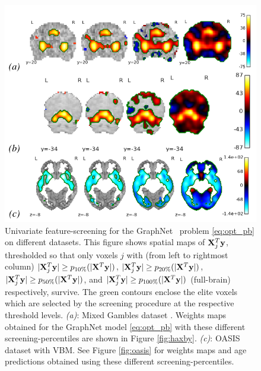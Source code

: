  \begin{figure}[!htb]
   \includegraphics[width=1\linewidth]{figures/screening.png}
\caption{Univariate feature-screening for the
  GraphNet~\citep{hebiri2011,grosenick2013}
  problem \eqref{eq:opt_pb} on
  different datasets.
  This figure shows spatial maps of
  $\mathbf{X}^T_j\mathbf{y}$, thresholded so that only voxels $j$ with (from left to
  rightmost column)  $|\mathbf{X}^T_j\mathbf{y}| \ge p_{10\%}(|\mathbf{X}^T\mathbf{y}|)$, $|\mathbf{X}^T_j\mathbf{y}| \ge
  p_{20\%}(|\mathbf{X}^T\mathbf{y}|)$, $|\mathbf{X}^T_j\mathbf{y}| \ge p_{50\%}(|\mathbf{X}^T\mathbf{y}|)$, and $|\mathbf{X}^T_j\mathbf{y}|
  \ge p_{100\%}(|\mathbf{X}^T\mathbf{y}|)$ (full-brain) respectively, survive. The
  green contours enclose the elite voxels which are selected by the
  screening procedure at the respective threshold
  levels. \textit{(a)}: Mixed Gambles dataset
   \citep{jimura2012}.%
  Weights maps obtained for the GraphNet
  model \eqref{eq:opt_pb} with these different
  screening-percentiles are shown in Figure
  \ref{fig:haxby}. \textit{(c)}: OASIS dataset  \citep{marcus2007open}
  with VBM. See Figure \ref{fig:oasis} for weights maps and
  age predictions obtained using these different
  screening-percentiles. %
}

\label{fig:screening}
\end{figure}

